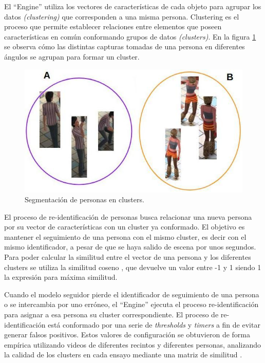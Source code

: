 \documentclass[conference]{IEEEtran}
\begin{document}
El “Engine” utiliza los vectores de características de cada objeto para agrupar los datos \textit{(clustering)} que corresponden a una misma persona. Clustering es el proceso que permite establecer relaciones entre elementos que poseen características en común conformando grupos de datos \textit{(clusters)}. En la figura \ref{fig:clusterPersonas} se observa cómo las distintas capturas tomadas de una persona en diferentes ángulos se agrupan para formar un cluster.

\begin{figure}[htbp]
\centerline{\includegraphics[scale=.5]{./Figures/clusterPersonas.jpg}}
\caption{Segmentación de personas en clusters.}
\label{fig:clusterPersonas}
\end{figure}

El proceso de re-identificación de personas busca relacionar una nueva persona por su vector de características con un cluster ya conformado. El objetivo es mantener el seguimiento de una persona con el mismo cluster, es decir con el mismo identificador, a pesar de que se haya salido de escena por unos segundos. Para
poder calcular la similitud entre el vector de una persona y los diferentes clusters se utiliza la similitud coseno \cite{b15}, que devuelve un valor entre -1 y 1 siendo 1 la expresión para máxima similitud.

Cuando el modelo seguidor pierde el identificador de seguimiento de una persona o se intercambia por uno erróneo, el “Engine” ejecuta el proceso re-identificación para asignar a esa persona su cluster correspondiente. El proceso de re-identificación está conformado por una serie de \textit{thresholds} y \textit{timers} a fin de evitar generar falsos positivos. Estos valores de configuración se obtuvieron de forma empírica utilizando videos de diferentes recintos y diferentes personas, analizando la calidad de los clusters en cada ensayo mediante una matriz de similitud \cite{b16}.
\end{document}
